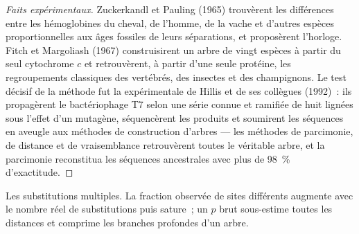 \begin{proof}[Faits expérimentaux]
Zuckerkandl et Pauling (1965) trouvèrent les différences entre les
hémoglobines du cheval, de l'homme, de la vache et d'autres espèces
proportionnelles aux âges fossiles de leurs séparations, et proposèrent
l'horloge. Fitch et
Margoliash (1967) construisirent un arbre de vingt espèces à partir du seul
cytochrome $c$ et retrouvèrent, à partir d'une seule protéine, les
regroupements classiques des vertébrés, des insectes et des champignons.
Le test décisif de la méthode fut la  expérimentale de Hillis et
de ses collègues (1992)~: ils propagèrent le bactériophage T7 selon une
série connue et ramifiée de huit lignées sous l'effet d'un mutagène,
séquencèrent les produits et soumirent les séquences en aveugle aux
méthodes de construction d'arbres --- les méthodes de parcimonie, de
distance et de vraisemblance retrouvèrent toutes le véritable arbre, et
la parcimonie reconstitua les séquences ancestrales avec plus de
\qty{98}{\%} d'exactitude.
\end{proof}

\begin{omfigure}

{\small Les substitutions multiples. La fraction observée de sites
différents augmente avec le nombre réel de substitutions puis sature~;
un $p$ brut sous-estime toutes les distances et comprime les branches
profondes d'un arbre.}
\end{omfigure}

